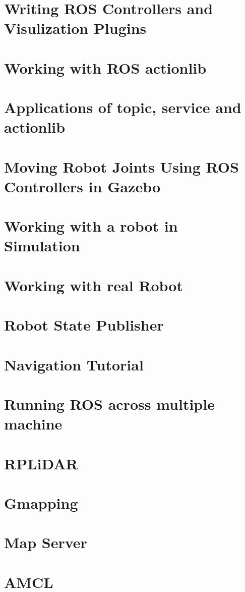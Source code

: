 \documentclass[11pt]{report}
\begin{document}
\chapter{Writing ROS Controllers and Visulization Plugins}


\chapter{Working with ROS actionlib}


\chapter{Applications of topic, service and actionlib}


\chapter{Moving Robot Joints Using ROS Controllers in Gazebo}


\chapter{Working with a robot in Simulation}


\chapter{Working with real Robot}


\chapter{Robot State Publisher}


\chapter{Navigation Tutorial}


\chapter{Running ROS across multiple machine}


\chapter{RPLiDAR}


\chapter{Gmapping}


\chapter{Map Server}


\chapter{AMCL}

\end{document}
